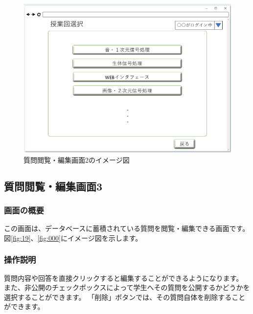 \begin{figure}[htbp]
  \begin{center}
    \includegraphics[width=1\linewidth,clip]{./img/18.png}
    \caption{質問閲覧・編集画面2のイメージ図}\label{fig:18}
  \end{center}
\end{figure}

\newpage

\subsection{質問閲覧・編集画面3}
\subsubsection{画面の概要}
この画面は、データベースに蓄積されている質問を閲覧・編集できる画面です。
図\ref{fig:19}、\ref{fig:000}にイメージ図を示します。

\subsubsection{操作説明}
質問内容や回答を直接クリックすると編集することができるようになります。
また、非公開のチェックボックスによって学生へその質問を公開するかどうかを選択することができます。
「削除」ボタンでは、その質問自体を削除することができます。


